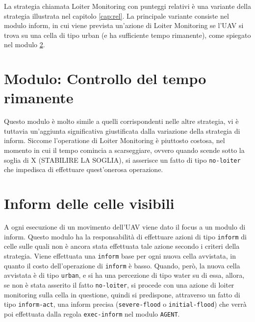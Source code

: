 La strategia chiamata Loiter Monitoring con punteggi relativi è una variante della strategia illustrata nel capitolo \ref{cap:rel}. La principale variante consiste nel modulo inform, in cui viene prevista un'azione di Loiter Monitoring se l'UAV si trova su una cella di tipo urban (e ha sufficiente tempo rimanente), come spiegato nel modulo \ref{sec:loiter-base-inform}.

\section{Modulo: Controllo del tempo rimanente} \label{sec:loiter-base-tempo}
Questo modulo è molto simile a quelli corrispondenti nelle altre strategia, vi è tuttavia un'aggiunta significativa giustificata dalla variazione della strategia di inform. Siccome l'operatione di Loiter Monitoring è piuttosto costosa, nel momento in cui il tempo comincia a scarseggiare, ovvero quando scende sotto la soglia di {\color{red}X (STABILIRE LA SOGLIA)}, si asserisce un fatto di tipo \texttt{no-loiter} che impedisca di effettuare quest'onerosa operazione.

\section{Inform delle celle visibili} \label{sec:loiter-base-inform}
A ogni esecuzione di un movimento dell'UAV viene dato il focus a un modulo di inform. Questo modulo ha la responsabilità di effettuare azioni di tipo \texttt{inform} di celle sulle quali non è ancora stata effettuata tale azione secondo i criteri della strategia. Viene effettuata una \texttt{inform} base per ogni nuova cella avvistata, in quanto il costo dell'operazione di \texttt{inform} è basso. Quando, però, la nuova cella avvistata è di tipo \texttt{urban}, e si ha una percezione di tipo water su di essa, allora, se non è stata asserito il fatto \texttt{no-loiter}, si procede con una azione di loiter monitoring sulla cella in questione, quindi si predispone, attraverso un fatto di tipo \texttt{inform-act}, una inform precisa (\texttt{severe-flood} o \texttt{initial-flood}) che verrà poi effettuata dalla regola \texttt{exec-inform} nel modulo \texttt{AGENT}.
